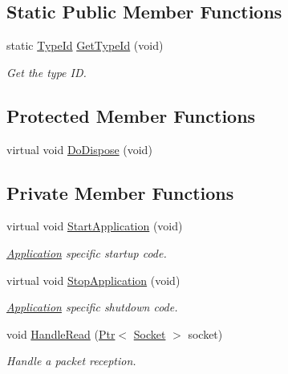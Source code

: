 \subsection*{Static Public Member Functions}
\begin{DoxyCompactItemize}
\item 
static \hyperlink{classns3_1_1TypeId}{Type\+Id} \hyperlink{classns3_1_1UdpServer_a61864021612e37496fa36d5574934ad0}{Get\+Type\+Id} (void)
\begin{DoxyCompactList}\small\item\em Get the type ID. \end{DoxyCompactList}\end{DoxyCompactItemize}
\subsection*{Protected Member Functions}
\begin{DoxyCompactItemize}
\item 
virtual void \hyperlink{classns3_1_1UdpServer_ad71ef84dbd09cd3356c007cbfecf660e}{Do\+Dispose} (void)
\end{DoxyCompactItemize}
\subsection*{Private Member Functions}
\begin{DoxyCompactItemize}
\item 
virtual void \hyperlink{classns3_1_1UdpServer_a784bd9b3274fc411c042b3502dacb3fa}{Start\+Application} (void)
\begin{DoxyCompactList}\small\item\em \hyperlink{classns3_1_1Application}{Application} specific startup code. \end{DoxyCompactList}\item 
virtual void \hyperlink{classns3_1_1UdpServer_adb29aa59623e5baa7f42642c3f811a72}{Stop\+Application} (void)
\begin{DoxyCompactList}\small\item\em \hyperlink{classns3_1_1Application}{Application} specific shutdown code. \end{DoxyCompactList}\item 
void \hyperlink{classns3_1_1UdpServer_a65a01672657a4a49f65cd3c3bb1ee420}{Handle\+Read} (\hyperlink{classns3_1_1Ptr}{Ptr}$<$ \hyperlink{classns3_1_1Socket}{Socket} $>$ socket)
\begin{DoxyCompactList}\small\item\em Handle a packet reception. \end{DoxyCompactList}\end{DoxyCompactItemize}
